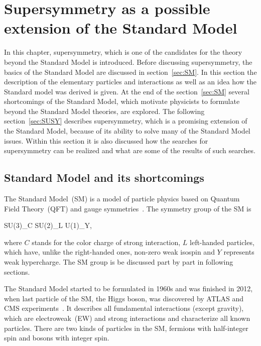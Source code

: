 \chapter{Supersymmetry as a possible extension of the Standard Model}

In this chapter, supersymmetry, which is one of the candidates for the theory beyond the Standard Model is introduced. Before discussing supersymmetry, the basics of the Standard Model are discussed in section~\ref{sec:SM}. In this section the description of the elementary particles and interactions as well as an idea how the Standard model was derived is given. At the end of the section~\ref{sec:SM} several shortcomings of the Standard Model, which motivate physicists to formulate beyond the Standard Model theories, are explored. The following section~\ref{sec:SUSY} describes supersymmetry, which is a promising extension of the Standard Model, because of its ability to solve many of the Standard Model issues. Within this section it is also discussed how the searches for supersymmetry can be realized and what are some of the results of such searches.   

\section{Standard Model and its shortcomings~\label{sec:SM}}

The Standard Model~(SM) is a model of particle physics based on Quantum Field Theory~(QFT) and gauge symmetries~\cite{9783527406012}. The symmetry group of the SM is

{
SU(3)_{C} \otimes SU(2)_{L} \otimes U(1)_{Y},
}

where $C$ stands for the color charge of strong interaction, $L$ left-handed particles, which have, unlike the right-handed ones, non-zero weak isospin and $Y$ represents weak hypercharge. The SM group is be discussed part by part in following sections.

The Standard Model started to be formulated in 1960s and was finished in 2012, when last particle of the SM, the Higgs boson, was discovered by ATLAS and CMS experiments~\cite{Chatrchyan:2012xdj, Aad:2012tfa}. It describes all fundamental interactions (except gravity), which are electroweak~(EW) and strong interactions and characterize all known particles. There are two kinds of particles in the SM, fermions with half-integer spin and bosons with integer spin.

